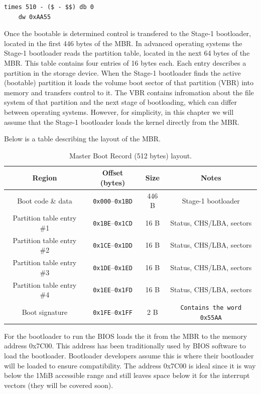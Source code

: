 \begin{lstlisting}[caption={MBR Signature}]
    times 510 - ($ - $$) db 0
    dw 0xAA55
\end{lstlisting}

Once the bootable is determined control is transfered to the Stage-1 bootloader, located in the first 446 bytes of the MBR.
In advanced operating systems the Stage-1 bootloader reads the partition table, located in the next 64 bytes of the MBR.
This table contains four entries of 16 bytes each. Each entry describes a partition in the storage device. When the Stage-1
bootloader finds the active (bootable) partition it loads the volume boot sector of that partition (VBR) into memory and transfers
control to it. The VBR contains infromation about the file system of that partition and the next stage of bootloading, which can differ
between operating systems. However, for simplicity, in this chapter we will assume that the Stage-1 bootloader loads the kernel directly 
from the MBR.

Below is a table describing the layout of the MBR.

\begin{table}[h]
    \centering
    \renewcommand{\arraystretch}{1.15}
    \begin{tabular}{|c|c|c|c|}
    \hline
    \textbf{Region} & \textbf{Offset (bytes)} & \textbf{Size} & \textbf{Notes} \\
    \hline
    Boot code \& data & \texttt{0x000}–\texttt{0x1BD} & 446 B & Stage-1 bootloader \\
    \hline
    Partition table entry \#1 & \texttt{0x1BE}–\texttt{0x1CD} & 16 B & Status, CHS/LBA, sectors \\
    \hline
    Partition table entry \#2 & \texttt{0x1CE}–\texttt{0x1DD} & 16 B & Status, CHS/LBA, sectors \\
    \hline
    Partition table entry \#3 & \texttt{0x1DE}–\texttt{0x1ED} & 16 B & Status, CHS/LBA, sectors \\
    \hline
    Partition table entry \#4 & \texttt{0x1EE}–\texttt{0x1FD} & 16 B & Status, CHS/LBA, sectors \\
    \hline
    Boot signature & \texttt{0x1FE}–\texttt{0x1FF} & 2 B & \texttt{Contains the word 0x55AA} \\
    \hline
    \end{tabular}
    \caption{Master Boot Record (512 bytes) layout.}
\end{table}
    
For the bootloader to run the BIOS loads the it from the MBR to the memory address 0x7C00. This address has been
traditionally used by BIOS software to load the bootloader. Bootloader developers assume this is where their 
bootloader will be loaded to ensure compatibility. The address 0x7C00 is ideal since it is way below the 1MiB 
accessible range and still leaves space below it for the interrupt vectors (they will be covered soon).


